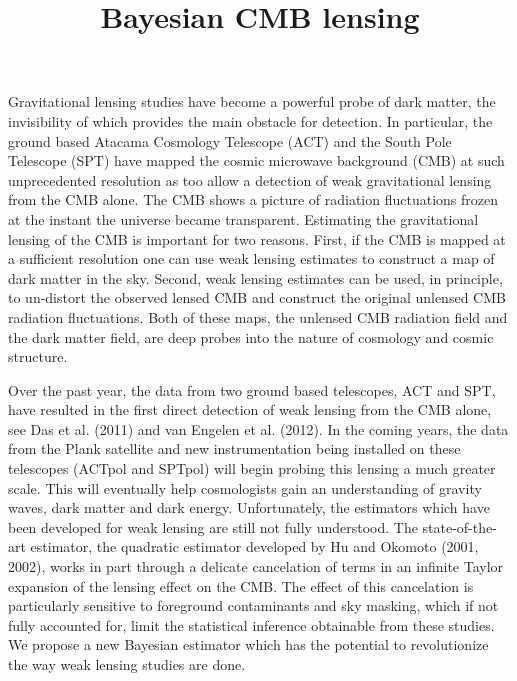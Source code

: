 \documentclass[11pt]{article}
\title{Bayesian CMB lensing}
\date{}
\begin{document}
\maketitle

Gravitational lensing studies have become a powerful probe of dark matter, the invisibility of which provides the main obstacle for detection. In particular, the ground based Atacama Cosmology Telescope (ACT)  and  the South Pole Telescope (SPT) have mapped the  cosmic microwave background (CMB)  at such unprecedented resolution as too allow a detection of weak gravitational lensing from the CMB alone.
The CMB shows a picture of radiation fluctuations frozen at the instant the universe became transparent. Estimating the gravitational lensing of the CMB  is important for two reasons. First, if the CMB is mapped at a sufficient resolution one can use weak lensing estimates to construct a map of dark matter in the sky.
Second,  weak lensing estimates  can be used, in principle,  to un-distort the observed lensed CMB and construct the original unlensed CMB radiation fluctuations. Both of these maps,  the unlensed CMB radiation field and the dark matter field, are deep probes into the nature of cosmology and cosmic structure. 

 Over the past year, the data from two ground based telescopes, ACT and SPT, have resulted in the first direct detection of weak lensing from the CMB alone, see Das et al. (2011) and van Engelen  et al. (2012). In the coming years, the data from the Plank satellite and  new instrumentation being installed on these telescopes (ACTpol and SPTpol) will begin probing this lensing a much greater scale. This will eventually help cosmologists gain an understanding of gravity waves,  dark matter and dark energy. Unfortunately, the estimators which have been developed for weak lensing are still not fully understood. The state-of-the-art estimator, the quadratic estimator developed by Hu and Okomoto (2001, 2002), works in part through a delicate cancelation of terms in an infinite Taylor expansion of the lensing effect on the CMB. The effect of this cancelation is particularly sensitive to foreground contaminants and sky masking, which  if not fully accounted for,  limit  the statistical inference obtainable from these studies. We propose a  new Bayesian estimator which has the potential to revolutionize the way weak lensing studies are done.  
  
\end{document}

